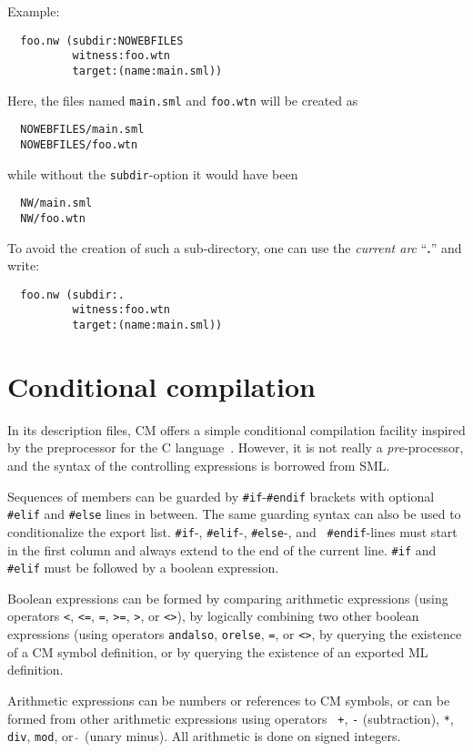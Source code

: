 \documentclass[titlepage,letterpaper]{article}
\begin{document}
Example:

\begin{verbatim}
  foo.nw (subdir:NOWEBFILES
          witness:foo.wtn
          target:(name:main.sml))
\end{verbatim}

Here, the files named {\tt main.sml} and {\tt foo.wtn} will be
created as
\begin{verbatim}
  NOWEBFILES/main.sml
  NOWEBFILES/foo.wtn
\end{verbatim}
\noindent while without the {\tt subdir}-option it would have been
\begin{verbatim}
  NW/main.sml
  NW/foo.wtn
\end{verbatim}
\noindent To avoid the creation of such a sub-directory, one can use
the {\em current arc} ``{\bf .}'' and write:
\begin{verbatim}
  foo.nw (subdir:.
          witness:foo.wtn
          target:(name:main.sml))
\end{verbatim}

\section{Conditional compilation}
\label{sec:preproc}

In its description files, CM offers a simple conditional compilation
facility inspired by the preprocessor for the C language~\cite{k&r2}.
However, it is not really a {\it pre}-processor, and the syntax of the
controlling expressions is borrowed from SML.

Sequences of members can be guarded by {\tt \#if}-{\tt \#endif}
brackets with optional {\tt \#elif} and {\tt \#else} lines in between.
The same guarding syntax can also be used to conditionalize the export
list.  {\tt \#if}-, {\tt \#elif}-, {\tt \#else}-, and {\tt
\#endif}-lines must start in the first column and always
extend to the end of the current line.  {\tt \#if} and {\tt \#elif}
must be followed by a boolean expression.

Boolean expressions can be formed by comparing arithmetic expressions
(using operators {\tt <}, {\tt <=}, {\tt =}, {\tt >=}, {\tt >}, or
{\tt <>}), by logically combining two other boolean expressions (using
operators {\tt andalso}, {\tt orelse}, {\tt =}, or {\tt <>}, by
querying the existence of a CM symbol definition, or by querying the
existence of an exported ML definition.

Arithmetic expressions can be numbers or references to CM symbols, or
can be formed from other arithmetic expressions using operators {\tt
+}, {\tt -} (subtraction), \verb|*|, {\tt div}, {\tt mod}, or $\tilde{~}$
(unary minus).  All arithmetic is done on signed integers.
\end{document}
